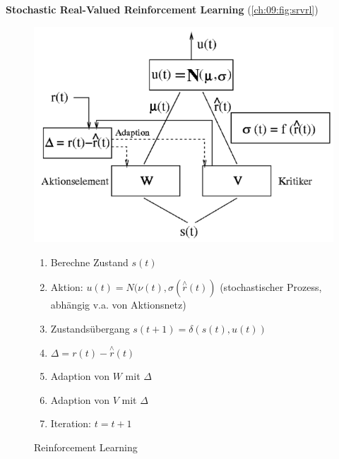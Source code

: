 \textbf{Stochastic Real-Valued Reinforcement Learning} (\autoref{ch:09:fig:srvrl})
\begin{figure}[h!]
	\begin{minipage}{0.5\linewidth}
		\centering
		\includegraphics[width=\textwidth]{figures/srvrl.png}
		\caption{Reinforcement Learning}
		\label{ch:09:fig:srvrl}
	\end{minipage}
	\begin{minipage}{0.5\linewidth}
		\begin{enumerate}
			\item Berechne Zustand $s(t)$
			\item Aktion: $u(t) = N(\nu (t), \sigma(\overset{\wedge}{r}(t))$ (stochastischer Prozess, abhängig v.a. von Aktionsnetz)
			\item Zustandsübergang $s(t + 1) = \delta (s(t),u(t))$
			\item $\Delta = r(t) - \overset{\wedge}{r}(t)$
			\item Adaption von $W$ mit $\Delta$
			\item Adaption von $V$ mit $\Delta$
			\item Iteration: $t = t + 1$
		\end{enumerate}	
	\end{minipage}
\end{figure}
